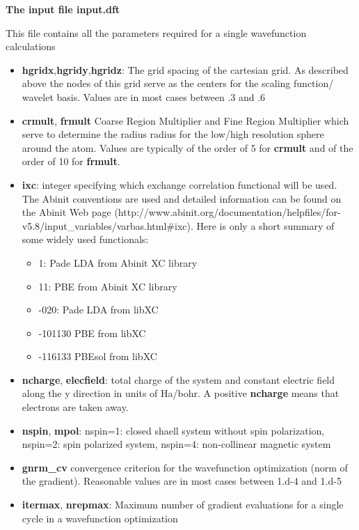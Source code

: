 \documentclass[a4paper,11pt]{report}
\begin{document}
\pagebreak
\begin{center} \large
{ \bf The input file input.dft}
\end{center}
This file contains all the parameters required for a single wavefunction calculations
\begin{itemize}
\item {\bf hgridx},{\bf hgridy},{\bf hgridz}: The grid spacing of the cartesian grid. As 
        described above the nodes of this grid serve as the centers for the scaling function/ wavelet basis. 
       Values are in most cases between .3 and .6

\item {\bf crmult}, {\bf frmult} Coarse Region Multiplier and Fine Region Multiplier which serve to determine the radius
      radius for the low/high resolution sphere around the atom. 
      Values are typically of the order of 5 for {\bf crmult} and of the order of 10 for  {\bf frmult}.
\item {\bf ixc}: integer specifying which exchange correlation functional will be used. The Abinit conventions are 
      used and detailed information can be found on the Abinit Web page 
      (http://www.abinit.org/documentation/helpfiles/for-v5.8/input\_variables/varbas.html\#ixc). 
       Here is only a short summary of some widely used functionals:
      \begin{itemize}
      \item  1: Pade LDA from Abinit XC library
      \item  11: PBE from Abinit XC library
      \item -020: Pade LDA from libXC
      \item -101130  PBE from  libXC
      \item -116133 PBEsol from libXC
      \end{itemize}
\item {\bf ncharge}, {\bf elecfield}: total charge of the system and constant electric field along the y direction in units of Ha/bohr. 
      A positive {\bf ncharge} means that electrons are taken away.
\item {\bf nspin}, {\bf mpol}: nspin=1: closed shaell system without spin polarization, nspin=2: spin polarized 
      system, nspin=4: non-collinear magnetic system
\item {\bf gnrm\_cv} convergence criterion for the wavefunction optimization (norm of the gradient).
      Reasonable values are in most cases between 1.d-4 and 1.d-5
\item {\bf itermax}, {\bf nrepmax}: Maximum number of gradient evaluations for a single cycle in a wavefunction optimization 

\end{itemize}
\end{document}
